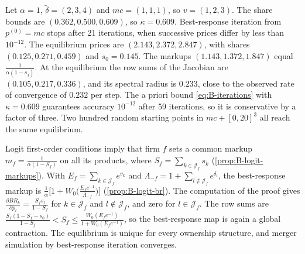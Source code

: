\begin{example}\label{ex:B-logit-br}
Let $\alpha = 1$, $\tilde\delta = (2, 3, 4)$ and $mc = (1, 1, 1)$, so $v = (1, 2, 3)$. The share bounds are
$(0.362, 0.500, 0.609)$, so $\kappa = 0.609$. Best-response iteration from $p^{(0)} = mc$ stops after 21
iterations, when successive prices differ by less than $10^{-12}$. The equilibrium prices are $(2.143, 2.372,
2.847)$, with shares $(0.125, 0.271, 0.459)$ and $s_0 = 0.145$. The markups $(1.143, 1.372, 1.847)$ equal
$\frac{1}{\alpha(1 - s_j)}$. At the equilibrium the row sums of the Jacobian are $(0.105, 0.217, 0.336)$, and
its spectral radius is $0.233$, close to the observed rate of convergence of $0.232$ per step. The a priori bound
\eqref{eq:B-iterations} with $\kappa = 0.609$ guarantees accuracy $10^{-12}$ after 59 iterations, so it is
conservative by a factor of three. Two hundred random starting points in $mc + [0, 20]^3$ all reach the same
equilibrium.
\end{example}

\begin{remark}\label{rem:B-logit-br-multi}
Logit first-order conditions imply that firm $f$ sets a common markup $m_f = \frac{1}{\alpha(1 - S_f)}$ on all
its products, where $S_f = \sum_{k \in \mathcal{J}_f}s_k$ (\cref{prop:B-logit-markups}). With $E_f = \sum_{k \in
\mathcal{J}_f}e^{v_k}$ and $\Lambda_{-f} = 1 + \sum_{l \notin \mathcal{J}_f}e^{\delta_l}$, the best-response
markup is $\frac{1}{\alpha}\big[1 + W_0\big(\frac{E_fe^{-1}}{\Lambda_{-f}}\big)\big]$ (\cref{prop:B-logit-br}). The
computation of the proof gives $\frac{\partial BR_k}{\partial p_l} = \frac{S_fs_l}{1 - S_f}$ for $k \in \mathcal{J}_f$ and $l
\notin \mathcal{J}_f$, and zero for $l \in \mathcal{J}_f$. The row sums are $\frac{S_f(1 - S_f - s_0)}{1 - S_f}
< S_f \leq \frac{W_0(E_fe^{-1})}{1 + W_0(E_fe^{-1})}$, so the best-response map is again a global contraction.
The equilibrium is unique for every ownership structure, and merger simulation by best-response iteration
converges.
\end{remark}

